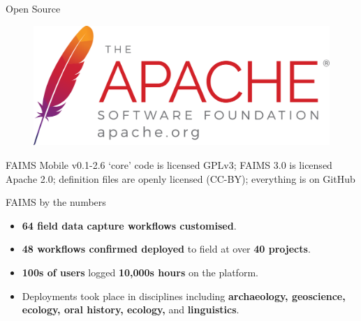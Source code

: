 \begin{frame}{Open Source}
 \begin{figure}[H]
    \centering
        \includegraphics[width=.65\textwidth]{figures/asf_logo_url.png}
        
        \label{fig:FAIMS-github-OSS}
 \end{figure}
 
FAIMS Mobile v0.1-2.6 `core' code is licensed GPLv3; FAIMS 3.0 is licensed Apache 2.0; definition files are openly licensed (CC-BY); everything is on GitHub 

\end{frame}


\begin{frame}{FAIMS by the numbers}
 \begin{itemize}
        \item \textbf{64 field data capture workflows customised}.
        \item \textbf{48 workflows confirmed deployed} to field at over \textbf{40 projects}.
        \item \textbf{100s of users} logged \textbf{10,000s hours} on the platform.
        \item Deployments took place in disciplines including \textbf{archaeology, geoscience, ecology, oral history, ecology, }and \textbf{linguistics}.
    \end{itemize}
\end{frame}


